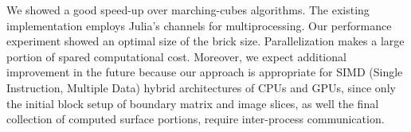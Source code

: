 We showed a good speed-up over marching-cubes algorithms. 
The existing implementation employs Julia's channels
for multiprocessing. 
Our performance experiment showed an optimal size of the brick size.
Parallelization makes a large portion of spared computational cost. 
%
Moreover, we expect additional improvement in the future because our approach is appropriate  for SIMD (Single Instruction, Multiple Data) hybrid architectures of CPUs and GPUs, since only the initial block setup of boundary matrix and image slices, as well the final collection of computed surface portions, require inter-process communication. 

